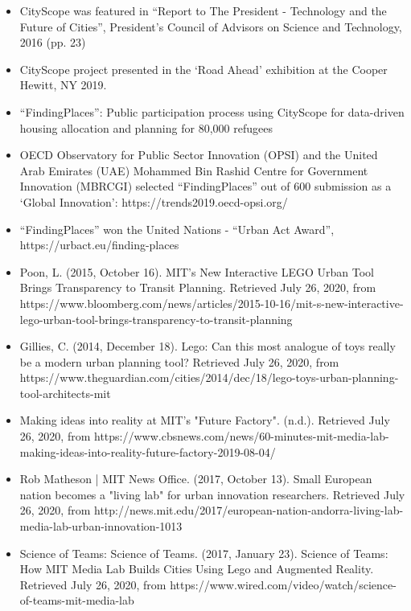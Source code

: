 \begin{itemize}

\item{CityScope was featured in “Report to The President - Technology and the Future of Cities”, President’s Council of Advisors on Science and Technology, 2016 (pp. 23)}

\item{CityScope project presented in the ‘Road Ahead’ exhibition at the Cooper Hewitt, NY 2019.}

\item{“FindingPlaces”: Public participation process using CityScope for data-driven housing allocation and planning for 80,000 refugees} 
    
\item{OECD Observatory for Public Sector Innovation (OPSI) and the United Arab Emirates (UAE) Mohammed Bin Rashid Centre for Government Innovation (MBRCGI) selected “FindingPlaces” out of 600 submission as a `Global Innovation': https://trends2019.oecd-opsi.org/}
    
\item{“FindingPlaces” won the United Nations - “Urban Act Award”, https://urbact.eu/finding-places}

\item{Poon, L. (2015, October 16). MIT's New Interactive LEGO Urban Tool Brings Transparency to Transit Planning. Retrieved July 26, 2020, from https://www.bloomberg.com/news/articles/2015-10-16/mit-s-new-interactive-lego-urban-tool-brings-transparency-to-transit-planning}

\item{Gillies, C. (2014, December 18). Lego: Can this most analogue of toys really be a modern urban planning tool? Retrieved July 26, 2020, from https://www.theguardian.com/cities/2014/dec/18/lego-toys-urban-planning-tool-architects-mit}

\item{Making ideas into reality at MIT's "Future Factory". (n.d.). Retrieved July 26, 2020, from https://www.cbsnews.com/news/60-minutes-mit-media-lab-making-ideas-into-reality-future-factory-2019-08-04/}
\item{Rob Matheson | MIT News Office. (2017, October 13). Small European nation becomes a "living lab" for urban innovation researchers. Retrieved July 26, 2020, from http://news.mit.edu/2017/european-nation-andorra-living-lab-media-lab-urban-innovation-1013}

\item{Science of Teams: Science of Teams. (2017, January 23). Science of Teams: How MIT Media Lab Builds Cities Using Lego and Augmented Reality. Retrieved July 26, 2020, from https://www.wired.com/video/watch/science-of-teams-mit-media-lab}


\end{itemize}
